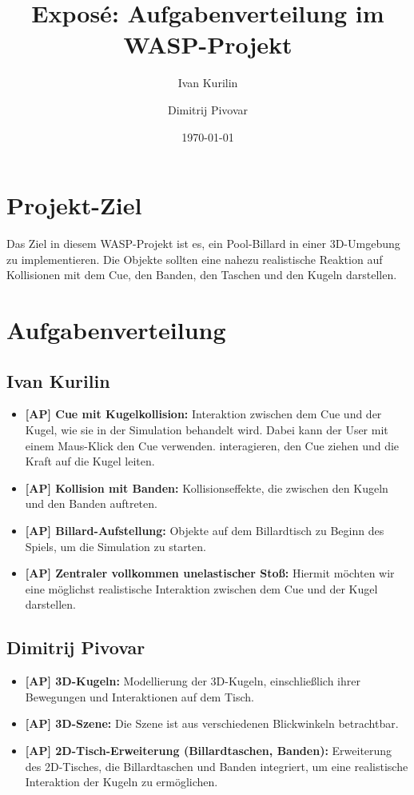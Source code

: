 \documentclass[11pt,a4paper]{article}
\title{Exposé: Aufgabenverteilung im WASP-Projekt}
\author{Ivan Kurilin \and Dimitrij Pivovar}
\date{\today}
\begin{document}
	
	\maketitle	
	\section*{Projekt-Ziel}	

	Das Ziel in diesem WASP-Projekt ist es, ein Pool-Billard in einer 3D-Umgebung zu implementieren. Die Objekte sollten eine nahezu realistische Reaktion auf Kollisionen mit dem Cue, den Banden, den Taschen und den Kugeln darstellen.
	
	\section*{Aufgabenverteilung}
	
\subsection*{Ivan Kurilin}
\begin{itemize}
\item \textbf{[AP] Cue mit Kugelkollision:} Interaktion zwischen dem Cue und der Kugel, wie sie in der Simulation behandelt wird.
Dabei kann der User mit einem Maus-Klick den Cue verwenden. interagieren, den Cue ziehen und die Kraft auf die Kugel leiten. 
\item \textbf{[AP] Kollision mit Banden:} Kollisionseffekte, die zwischen den Kugeln und den Banden auftreten.
\item \textbf{[AP] Billard-Aufstellung:} Objekte auf dem Billardtisch zu Beginn des Spiels, um die Simulation zu starten.
\item \textbf{[AP] Zentraler vollkommen unelastischer Stoß:}
Hiermit möchten wir eine möglichst realistische Interaktion zwischen dem Cue und der Kugel darstellen.

\end{itemize}
	
\subsection*{Dimitrij Pivovar}
\begin{itemize}
\item \textbf{[AP] 3D-Kugeln:} Modellierung der 3D-Kugeln, einschließlich ihrer Bewegungen und Interaktionen auf dem Tisch.
\item \textbf{[AP] 3D-Szene:} Die Szene ist aus verschiedenen Blickwinkeln betrachtbar.
\item \textbf{[AP] 2D-Tisch-Erweiterung (Billardtaschen, Banden):} Erweiterung des 2D-Tisches, die Billardtaschen und Banden integriert, um eine realistische Interaktion der Kugeln zu ermöglichen.
\end{itemize}
\end{document}
